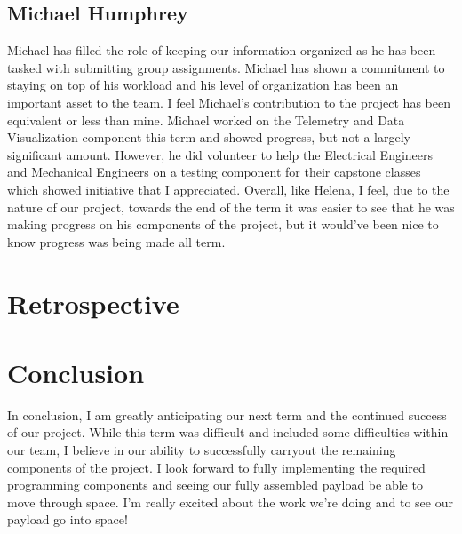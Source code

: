 \documentclass[letterpaper,10pt]{article}
\begin{document}
 \subsection{Michael Humphrey}
 Michael has filled the role of keeping our information organized as he has been tasked with submitting
 group assignments. Michael has shown a commitment to staying on top of his workload and his
 level of organization has been an important asset to the team. I feel Michael's contribution to the
 project has been equivalent or less than mine. Michael worked on the Telemetry and Data Visualization
 component this term and showed progress, but not a largely significant amount. However, he did
 volunteer to help the Electrical Engineers and Mechanical Engineers on a testing component for their
 capstone classes which showed initiative that I appreciated. Overall, like Helena, I feel, due to the 
 nature of our project, towards the end of the term it was easier to see that he was making progress
 on his components of the project, but it would've been nice to know progress was being made
 all term.
 
\section{Retrospective}


\section{Conclusion}
In conclusion, I am greatly anticipating our next term and the continued success of our project. While 
this term was difficult and included some difficulties within our team, I believe in our ability to
 successfully carryout the remaining components of the project. I look forward to fully implementing
 the required programming components and seeing our fully assembled payload be able to move
 through space. I'm really excited about the work we're doing and to see our payload go into space!
 
\end{document}
